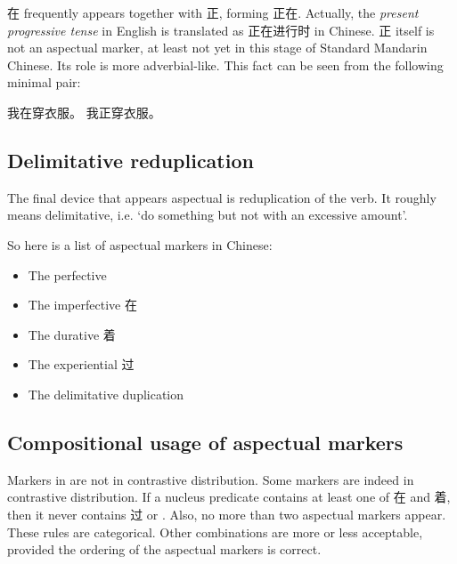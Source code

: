 在 frequently appears together with 正, forming 正在. 
Actually, the \emph{present progressive tense} in English is translated as 正在进行时 in Chinese.
正 itself is not an aspectual marker, at least not yet in this stage of Standard Mandarin Chinese.
Its role is more adverbial-like.
This fact can be seen from the following minimal pair:
\begin{exe}
    \ex \begin{xlist}
        \ex 我在穿衣服。
        \ex *我正穿衣服。%
    \end{xlist}
\end{exe}

\subsection{Delimitative reduplication}\label{sec:delimitative-reduplication}

The final device that appears aspectual is reduplication of the verb. 
It roughly means delimitative, i.e. `do something but not with an excessive amount'.

So here is a list of aspectual markers in Chinese: 
\begin{itemize}
    \item The perfective 
    \item The imperfective 在
    \item The durative 着
    \item The experiential 过
    \item The delimitative duplication
\end{itemize}

\subsection{Compositional usage of aspectual markers}

Markers in  are not in contrastive distribution.
Some markers are indeed in contrastive distribution. 
If a nucleus predicate contains at least one of 在 and 着, 
then it never contains 过 or .
Also, no more than two aspectual markers appear.
These rules are categorical. Other combinations are more or less acceptable,
provided the ordering of the aspectual markers is correct.

